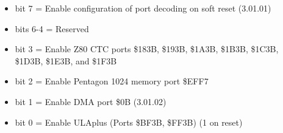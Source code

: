 \begin{itemize}
\item bit 7 = Enable configuration of port decoding on soft reset (3.01.01)
\item bits 6-4 = Reserved
\item bit 3 = Enable Z80 CTC ports \$183B, \$193B, \$1A3B, \$1B3B, \$1C3B,
  \$1D3B, \$1E3B, and \$1F3B
\item bit 2 = Enable Pentagon 1024 memory port \$EFF7
\item bit 1 = Enable DMA port \$0B (3.01.02)
\item bit 0 = Enable ULAplus (Ports \$BF3B, \$FF3B) (1 on reset)
\end{itemize}

